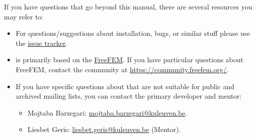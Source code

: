 If you have questions that go beyond this manual, there are several
resources you may refer to:
\begin{itemize}
\item For questions/suggestions about \biodeg{} installation, bugs, or similar stuff please use the 
	\href{https://github.com/mbarzegary/BioDeg/issues}{\biodeg{} issue tracker}. 

\item \biodeg{} is primarily based on the \href{http://www.freefem.org/}{FreeFEM}. If you have particular questions about FreeFEM, contact the community at \url{https://community.freefem.org/}.

\item If you have specific questions about \biodeg{} that are not suitable
  for public and archived mailing lists, you can contact the
  primary developer and mentor:
  \begin{itemize}
  \item Mojtaba Barzegari: \url{mojtaba.barzegari@kuleuven.be}.
  \item Liesbet Geris: \url{liesbet.geris@kuleuven.be} (Mentor).
  \end{itemize}
\end{itemize}
